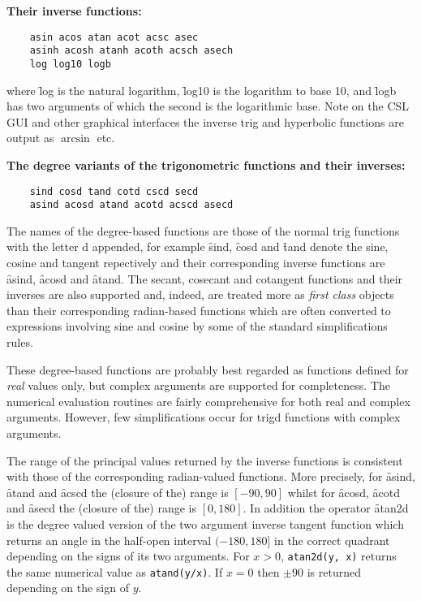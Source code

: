 \textbf{Their inverse functions:}
\begin{verbatim}
    asin acos atan acot acsc asec 
    asinh acosh atanh acoth acsch asech
    log log10 logb
\end{verbatim}
where \f{log} is the natural logarithm, \f{log10} is the logarithm to
base 10, and \f{logb} has two arguments of which the second is the
logarithmic base.
Note on the CSL GUI and other graphical interfaces
the inverse trig and hyperbolic functions are output as $\arcsin$ etc.

\textbf{The degree variants of the trigonometric functions and their inverses:}
\begin{verbatim}
    sind cosd tand cotd cscd secd
    asind acosd atand acotd acscd asecd
\end{verbatim}
The names of the degree-based functions are those of the normal trig
functions with the letter d appended, for example \f{sind}, \f{cosd}
and \f{tand} denote the sine, cosine and tangent repectively and their
corresponding inverse functions are \f{asind}, \f{acosd} and
\f{atand}. The secant, cosecant and cotangent functions and their
inverses are also supported and, indeed, are treated more as
\textit{first class} objects than their corresponding radian-based
functions which are often converted to expressions involving sine and
cosine by some of the standard {\REDUCE} simplifications rules.

These degree-based functions are probably best regarded as functions
defined for \emph{real} values only, but complex arguments are
supported for completeness. The numerical evaluation routines are
fairly comprehensive for both real and complex arguments. However, few
simplifications occur for trigd functions with complex arguments.

The range of the principal values returned by the inverse functions is
consistent with those of the corresponding radian-valued functions.
More precisely, for \f{asind}, \f{atand} and \f{acscd} the (closure of
the) range is $[-90, 90]$ whilst for \f{acosd}, \f{acotd} and
\f{asecd} the (closure of the) range is $[0, 180]$. In addition the
operator \f{atan2d} is the degree valued version of the two argument
inverse tangent function which returns an angle in the half-open
interval $(-180, 180]$ in the correct quadrant depending on the signs
of its two arguments. For $x>0$, \texttt{atan2d(y, x)} returns the
same numerical value as \texttt{atand(y/x)}. If $x=0$ then $\pm 90$ is
returned depending on the sign of $y$.

